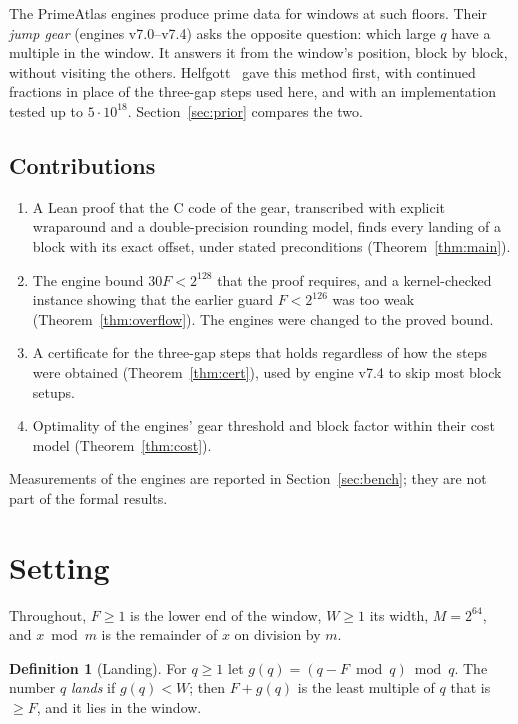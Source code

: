 \documentclass[11pt]{amsart}
\theoremstyle{definition}
\newtheorem{definition}{Definition}
\begin{document}
The PrimeAtlas engines produce prime data for windows at such floors. Their \emph{jump
gear} (engines v7.0--v7.4) asks the opposite question: which large $q$ have a multiple in the
window. It answers it from the window's position, block by block, without visiting the
others. Helfgott~\cite{helfgott} gave this method first, with continued fractions in place
of the three-gap steps used here, and with an implementation tested up to $5\cdot 10^{18}$.
Section~\ref{sec:prior} compares the two.

\subsection*{Contributions}
\begin{enumerate}
  \item[(C1)] A Lean proof that the C code of the gear, transcribed with explicit
    wraparound and a double-precision rounding model, finds every landing of a block with
    its exact offset, under stated preconditions (Theorem~\ref{thm:main}).
  \item[(C2)] The engine bound $30F < 2^{128}$ that the proof requires, and a kernel-checked
    instance showing that the earlier guard $F < 2^{126}$ was too weak
    (Theorem~\ref{thm:overflow}). The engines were changed to the proved bound.
  \item[(C3)] A certificate for the three-gap steps that holds regardless of how the steps
    were obtained (Theorem~\ref{thm:cert}), used by engine v7.4 to skip most block setups.
  \item[(C4)] Optimality of the engines' gear threshold and block factor within their cost
    model (Theorem~\ref{thm:cost}).
\end{enumerate}
Measurements of the engines are reported in Section~\ref{sec:bench}; they are not part of
the formal results.

\section{Setting}\label{sec:setting}

Throughout, $F \ge 1$ is the lower end of the window, $W \ge 1$ its width, $M = 2^{64}$, and
$x \bmod m$ is the remainder of $x$ on division by $m$.

\begin{definition}[Landing]
For $q \ge 1$ let $g(q) = (q - F \bmod q) \bmod q$. The number $q$ \emph{lands} if
$g(q) < W$; then $F + g(q)$ is the least multiple of $q$ that is $\ge F$, and it lies in the
window.
\end{definition}
\end{document}
